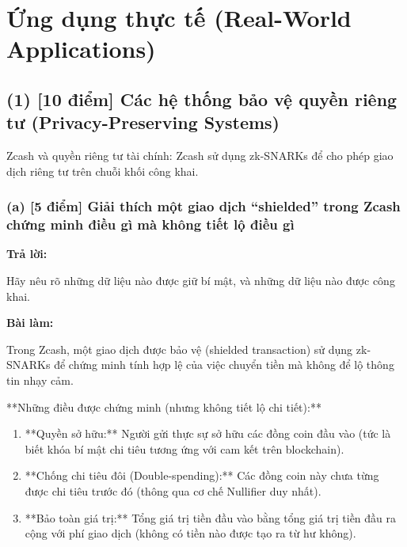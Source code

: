 \section{Ứng dụng thực tế (Real-World Applications)}

\subsection{(1) [10 điểm] Các hệ thống bảo vệ quyền riêng tư (Privacy-Preserving Systems)}

Zcash và quyền riêng tư tài chính:
Zcash sử dụng zk-SNARKs để cho phép giao dịch riêng tư trên chuỗi khối công khai.

\subsubsection{(a) [5 điểm] Giải thích một giao dịch ``shielded'' trong Zcash chứng minh điều gì mà không tiết lộ điều gì}

\begin{center}
    \textbf{Trả lời:}
\end{center}

Hãy nêu rõ những dữ liệu nào được giữ bí mật, và những dữ liệu nào được công khai.

\textbf{Bài làm:}

Trong Zcash, một giao dịch được bảo vệ (shielded transaction) sử dụng zk-SNARKs để chứng minh tính hợp lệ của việc chuyển tiền mà không để lộ thông tin nhạy cảm.

**Những điều được chứng minh (nhưng không tiết lộ chi tiết):**
\begin{enumerate}
    \item **Quyền sở hữu:** Người gửi thực sự sở hữu các đồng coin đầu vào (tức là biết khóa bí mật chi tiêu tương ứng với cam kết trên blockchain).
    \item **Chống chi tiêu đôi (Double-spending):** Các đồng coin này chưa từng được chi tiêu trước đó (thông qua cơ chế Nullifier duy nhất).
    \item **Bảo toàn giá trị:** Tổng giá trị tiền đầu vào bằng tổng giá trị tiền đầu ra cộng với phí giao dịch (không có tiền nào được tạo ra từ hư không).
\end{enumerate}

